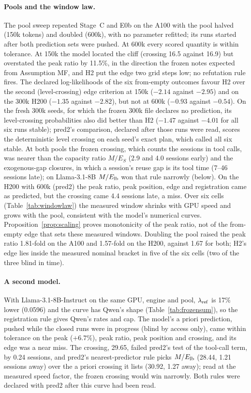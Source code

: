 \paragraph{Pools and the window law.} The pool sweep repeated Stage~C and E0b on the A100 with the pool halved (150k tokens) and doubled (600k), with no parameter refitted; its runs started after both prediction sets were pushed. At 600k every scored quantity is within tolerance. At 150k the model located the cliff (crossing 16.5 against 16.9) but overstated the peak ratio by 11.5\%, in the direction the frozen notes expected from Assumption MF, and H2 put the edge two grid steps low; no refutation rule fires. The declared log-likelihoods of the six from-empty outcomes favour H2 over the second (level-crossing) edge criterion at 150k ($-2.14$ against $-2.95$) and on the 300k H200 ($-1.35$ against $-2.82$), but not at 600k ($-0.93$ against $-0.54$). On the fresh 300k seeds, for which the frozen 300k file declares no prediction, its level-crossing probabilities also did better than H2 ($-1.47$ against $-4.01$ for all six runs stable); pred2's comparison, declared after those runs were read, scores the deterministic level crossing on each seed's exact plan, which called all six stable. At both pools the frozen crossing, which counts the sessions in tool calls, was nearer than the capacity ratio $M/E_S$ (2.9 and 4.0 sessions early) and the exogenous-gap closures, in which a session's reuse gap is its tool time (7--46 sessions late); on Llama-3.1-8B $M/E_{\mathrm{lb}}$ won that rule narrowly (below). On the H200 with 600k (pred2) the peak ratio, peak position, edge and registration came as predicted, but the crossing came 4.4 sessions late, a miss. Over six cells (Table~\ref{tab:windowlaw}) the measured window shrinks with GPU speed and grows with the pool, consistent with the model's numerical curves. Proposition~\ref{prop:scaling} proves monotonicity of the peak ratio, not of the from-empty edge that sets these measured windows. Doubling the pool raised the peak ratio 1.81-fold on the A100 and 1.57-fold on the H200, against 1.67 for both; H2's edge lies inside the measured nominal bracket in five of the six cells (two of the three blind in time).

\paragraph{A second model.} With Llama-3.1-8B-Instruct on the same GPU, engine and pool, $\lambda_{\mathrm{ref}}$ is 17\% lower (0.0596\sps) and the curve has Qwen's shape (Table~\ref{tab:frozensum}), so the registration rule gives Qwen's rates and cap. The model's a priori prediction, pushed while the closed runs were in progress (blind by access only), came within tolerance on the peak ($+6.7\%$), peak ratio, peak position and crossing, and its edge was a near miss. The crossing, 29.65, failed pred2's test of the tool-call term, by 0.24 sessions, and pred2's nearest-predictor rule picks $M/E_{\mathrm{lb}}$ (28.44, 1.21 sessions away) over the a priori crossing it lists (30.92, 1.27 away); read at the measured speed factor, the frozen crossing would win narrowly. Both rules were declared with pred2 after this curve had been read.

